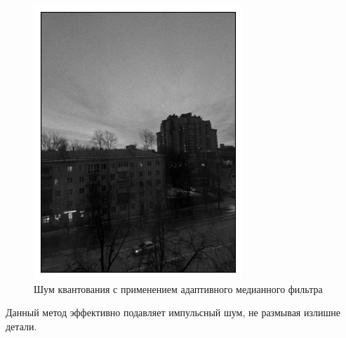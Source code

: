 \documentclass[a4paper,12pt]{article}
\begin{document}
\begin{figure}[H]
\begin{minipage}{0.49\textwidth}
        \centering \includegraphics[width=\textwidth]{results/nlf_pois_5.png}
        \caption{Шум квантования с применением адаптивного медианного фильтра}
    \end{minipage}
\end{figure}
\noindent
Данный метод эффективно подавляет импульсный шум, не размывая излишне детали.
\end{document}
